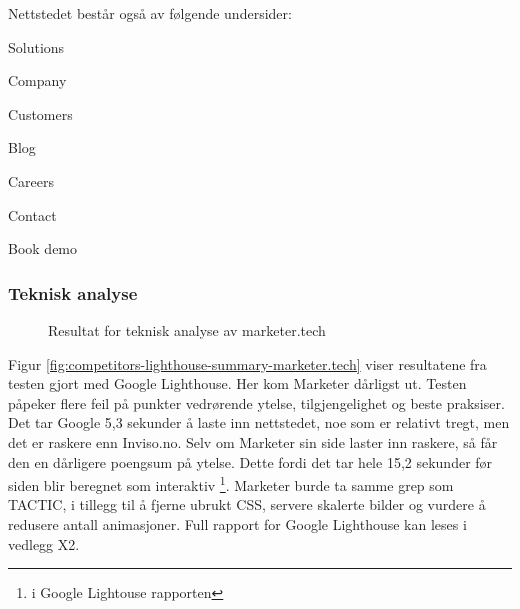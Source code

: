 Nettstedet består også av følgende undersider:
\begin{compactitem}
\item Solutions
\item Company
\item Customers
\item Blog
\item Careers 
\item Contact
\item Book demo
\end{compactitem}

\subsubsection{Teknisk analyse}
\begin{figure}[H]
    \begin{center}
        
        \label{fig:competitors-tech_analysis-marketer.tech}
        \caption{Resultat for teknisk analyse av marketer.tech}
    \end{center}
\end{figure}

Figur \ref{fig:competitors-lighthouse-summary-marketer.tech} viser resultatene fra testen gjort med Google Lighthouse. Her kom Marketer dårligst ut. Testen påpeker flere feil på punkter vedrørende ytelse, tilgjengelighet og beste praksiser. Det tar Google 5,3 sekunder å laste inn nettstedet, noe som er relativt tregt, men det er raskere enn Inviso.no. Selv om Marketer sin side laster inn raskere, så får den en dårligere poengsum på ytelse. Dette fordi det tar hele 15,2 sekunder før siden blir beregnet som interaktiv \footnote{ i Google Lightouse rapporten}. Marketer burde ta samme grep som TACTIC, i tillegg til å fjerne ubrukt CSS, servere skalerte bilder og vurdere å redusere antall animasjoner.
Full rapport for Google Lighthouse kan leses i vedlegg X2.

